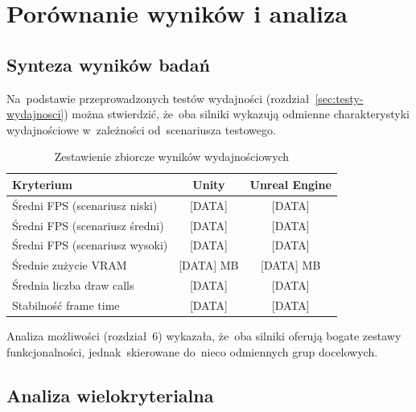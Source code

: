 \clearpage
\section{Porównanie wyników i analiza}

\subsection{Synteza wyników badań}


Na~podstawie przeprowadzonych testów wydajności (rozdział~\ref{sec:testy-wydajnosci}) można stwierdzić, że~oba silniki wykazują odmienne charakterystyki wydajnościowe w~zależności od~scenariusza testowego.

\begin{table}[h!]
    \centering
    \caption{Zestawienie zbiorcze wyników wydajnościowych}
    \label{tab:performance-summary}
    \begin{tabular}{|l|c|c|}
        \hline
        \textbf{Kryterium} & \textbf{Unity} & \textbf{Unreal Engine} \\
        \hline\hline
        Średni FPS (scenariusz niski) & [DATA] & [DATA] \\
        \hline
        Średni FPS (scenariusz średni) & [DATA] & [DATA] \\
        \hline
        Średni FPS (scenariusz wysoki) & [DATA] & [DATA] \\
        \hline
        Średnie zużycie VRAM & [DATA] MB & [DATA] MB \\
        \hline
        Średnia liczba draw calls & [DATA] & [DATA] \\
        \hline
        Stabilność frame time & [DATA] & [DATA] \\
        \hline
    \end{tabular}
\end{table}


Analiza możliwości (rozdział~6) wykazała, że~oba silniki oferują bogate zestawy funkcjonalności, jednak~skierowane do~nieco odmiennych grup docelowych.

\subsection{Analiza wielokryterialna}


